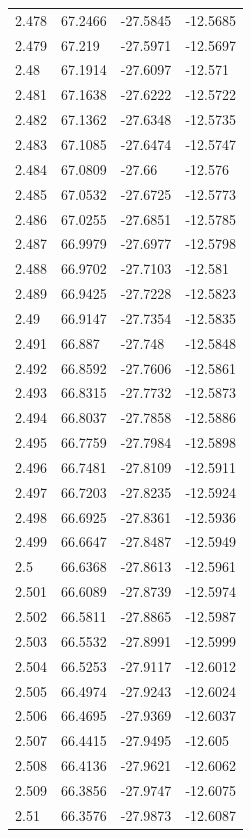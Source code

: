 \begin{tabular}{llll}
2.478 & 67.2466 & -27.5845 & -12.5685 \\
2.479 & 67.219 & -27.5971 & -12.5697 \\
2.48 & 67.1914 & -27.6097 & -12.571 \\
2.481 & 67.1638 & -27.6222 & -12.5722 \\
2.482 & 67.1362 & -27.6348 & -12.5735 \\
2.483 & 67.1085 & -27.6474 & -12.5747 \\
2.484 & 67.0809 & -27.66 & -12.576 \\
2.485 & 67.0532 & -27.6725 & -12.5773 \\
2.486 & 67.0255 & -27.6851 & -12.5785 \\
2.487 & 66.9979 & -27.6977 & -12.5798 \\
2.488 & 66.9702 & -27.7103 & -12.581 \\
2.489 & 66.9425 & -27.7228 & -12.5823 \\
2.49 & 66.9147 & -27.7354 & -12.5835 \\
2.491 & 66.887 & -27.748 & -12.5848 \\
2.492 & 66.8592 & -27.7606 & -12.5861 \\
2.493 & 66.8315 & -27.7732 & -12.5873 \\
2.494 & 66.8037 & -27.7858 & -12.5886 \\
2.495 & 66.7759 & -27.7984 & -12.5898 \\
2.496 & 66.7481 & -27.8109 & -12.5911 \\
2.497 & 66.7203 & -27.8235 & -12.5924 \\
2.498 & 66.6925 & -27.8361 & -12.5936 \\
2.499 & 66.6647 & -27.8487 & -12.5949 \\
2.5 & 66.6368 & -27.8613 & -12.5961 \\
2.501 & 66.6089 & -27.8739 & -12.5974 \\
2.502 & 66.5811 & -27.8865 & -12.5987 \\
2.503 & 66.5532 & -27.8991 & -12.5999 \\
2.504 & 66.5253 & -27.9117 & -12.6012 \\
2.505 & 66.4974 & -27.9243 & -12.6024 \\
2.506 & 66.4695 & -27.9369 & -12.6037 \\
2.507 & 66.4415 & -27.9495 & -12.605 \\
2.508 & 66.4136 & -27.9621 & -12.6062 \\
2.509 & 66.3856 & -27.9747 & -12.6075 \\
2.51 & 66.3576 & -27.9873 & -12.6087 \\

\end{tabular}
